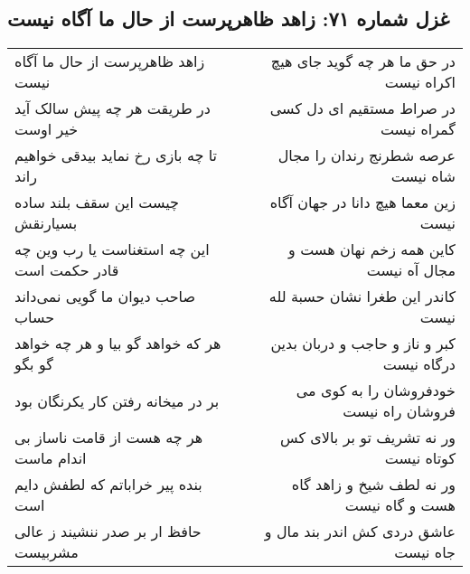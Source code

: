 \begin{center}
\section*{غزل شماره ۷۱: زاهد ظاهرپرست از حال ما آگاه نیست}
\label{sec:sh071}
\begin{longtable}{l p{0.5cm} r}
زاهد ظاهرپرست از حال ما آگاه نیست
&&
در حق ما هر چه گوید جای هیچ اکراه نیست
\\
در طریقت هر چه پیش سالک آید خیر اوست
&&
در صراط مستقیم ای دل کسی گمراه نیست
\\
تا چه بازی رخ نماید بیدقی خواهیم راند
&&
عرصه شطرنج رندان را مجال شاه نیست
\\
چیست این سقف بلند ساده بسیارنقش
&&
زین معما هیچ دانا در جهان آگاه نیست
\\
این چه استغناست یا رب وین چه قادر حکمت است
&&
کاین همه زخم نهان هست و مجال آه نیست
\\
صاحب دیوان ما گویی نمی‌داند حساب
&&
کاندر این طغرا نشان حسبة لله نیست
\\
هر که خواهد گو بیا و هر چه خواهد گو بگو
&&
کبر و ناز و حاجب و دربان بدین درگاه نیست
\\
بر در میخانه رفتن کار یکرنگان بود
&&
خودفروشان را به کوی می فروشان راه نیست
\\
هر چه هست از قامت ناساز بی اندام ماست
&&
ور نه تشریف تو بر بالای کس کوتاه نیست
\\
بنده پیر خراباتم که لطفش دایم است
&&
ور نه لطف شیخ و زاهد گاه هست و گاه نیست
\\
حافظ ار بر صدر ننشیند ز عالی مشربیست
&&
عاشق دردی کش اندر بند مال و جاه نیست
\\
\end{longtable}
\end{center}
